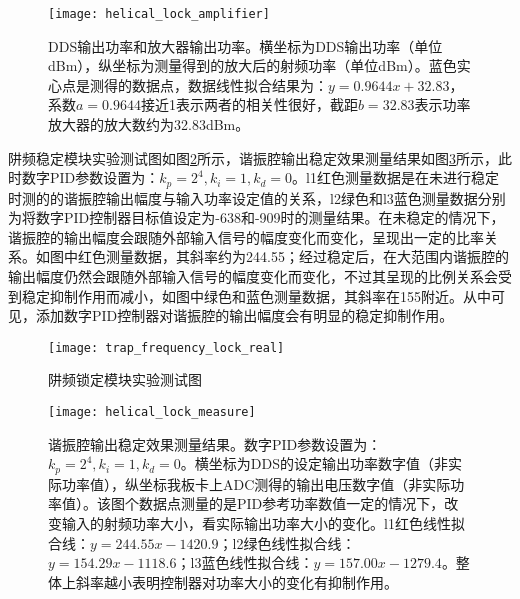 \begin{figure}
    \centering
    \caption[DDS输出功率和放大器输出功率]{DDS输出功率和放大器输出功率。横坐标为DDS输出功率（单位dBm），纵坐标为测量得到的放大后的射频功率（单位dBm）。蓝色实心点是测得的数据点，数据线性拟合结果为：$y=0.9644x+32.83$，系数$a=0.9644$接近1表示两者的相关性很好，截距$b=32.83$表示功率放大器的放大数约为32.83dBm。\label{fig:helical_lock_amplifier}}
    \texttt{[image: helical\_lock\_amplifier]}
\end{figure}

阱频稳定模块实验测试图如图\ref{fig:trap_frequency_lock_real}所示，谐振腔输出稳定效果测量结果如图\ref{fig:helical_lock_measure}所示，此时数字PID参数设置为：$k_p=2^4,k_i=1,k_d=0$。l1红色测量数据是在未进行稳定时测的的谐振腔输出幅度与输入功率设定值的关系，l2绿色和l3蓝色测量数据分别为将数字PID控制器目标值设定为-638和-909时的测量结果。在未稳定的情况下，谐振腔的输出幅度会跟随外部输入信号的幅度变化而变化，呈现出一定的比率关系。如图中红色测量数据，其斜率约为244.55；经过稳定后，在大范围内谐振腔的输出幅度仍然会跟随外部输入信号的幅度变化而变化，不过其呈现的比例关系会受到稳定抑制作用而减小，如图中绿色和蓝色测量数据，其斜率在155附近。从中可见，添加数字PID控制器对谐振腔的输出幅度会有明显的稳定抑制作用。

\begin{figure}
    \centering
    \caption[阱频锁定模块实验测试图]{阱频锁定模块实验测试图\label{fig:trap_frequency_lock_real}}
    \texttt{[image: trap\_frequency\_lock\_real]}
\end{figure}

\begin{figure}
    \centering
    \caption[谐振腔输出稳定效果测量结果]{谐振腔输出稳定效果测量结果。数字PID参数设置为：$k_p=2^4,k_i=1,k_d=0$。横坐标为DDS的设定输出功率数字值（非实际功率值），纵坐标我板卡上ADC测得的输出电压数字值（非实际功率值）。该图个数据点测量的是PID参考功率数值一定的情况下，改变输入的射频功率大小，看实际输出功率大小的变化。l1红色线性拟合线：$y=244.55x-1420.9$；l2绿色线性拟合线：$y=154.29x-1118.6$；l3蓝色线性拟合线：$y=157.00x-1279.4$。整体上斜率越小表明控制器对功率大小的变化有抑制作用。\label{fig:helical_lock_measure}}
    \texttt{[image: helical\_lock\_measure]}
\end{figure}



\newpage
